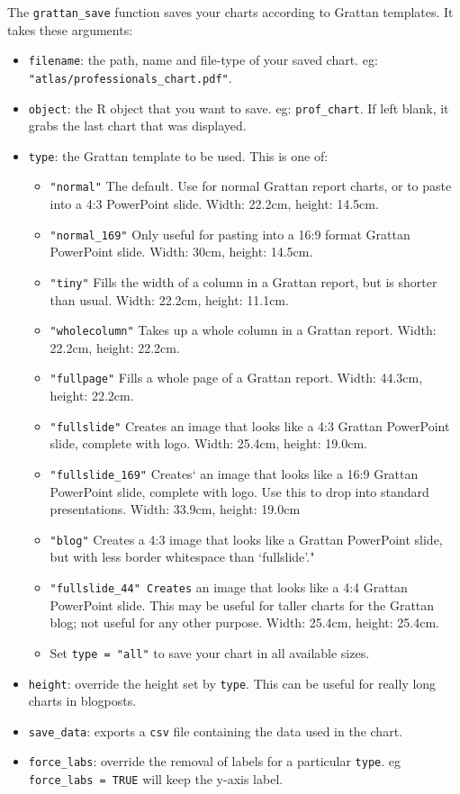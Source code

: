 \documentclass[
]{book}
\providecommand{\tightlist}{%
  \setlength{\itemsep}{0pt}\setlength{\parskip}{0pt}}
\begin{document}
The \texttt{grattan\_save} function saves your charts according to Grattan templates. It takes these arguments:

\begin{itemize}
\tightlist
\item
  \texttt{filename}: the path, name and file-type of your saved chart. eg: \texttt{"atlas/professionals\_chart.pdf"}.
\item
  \texttt{object}: the R object that you want to save. eg: \texttt{prof\_chart}. If left blank, it grabs the last chart that was displayed.
\item
  \texttt{type}: the Grattan template to be used. This is one of:

  \begin{itemize}
  \tightlist
  \item
    \texttt{"normal"} The default. Use for normal Grattan report charts, or to paste into a 4:3 PowerPoint slide. Width: 22.2cm, height: 14.5cm.
  \item
    \texttt{"normal\_169"} Only useful for pasting into a 16:9 format Grattan PowerPoint slide. Width: 30cm, height: 14.5cm.
  \item
    \texttt{"tiny"} Fills the width of a column in a Grattan report, but is shorter than usual. Width: 22.2cm, height: 11.1cm.
  \item
    \texttt{"wholecolumn"} Takes up a whole column in a Grattan report. Width: 22.2cm, height: 22.2cm.
  \item
    \texttt{"fullpage"} Fills a whole page of a Grattan report. Width: 44.3cm, height: 22.2cm.
  \item
    \texttt{"fullslide"} Creates an image that looks like a 4:3 Grattan PowerPoint slide, complete with logo. Width: 25.4cm, height: 19.0cm.
  \item
    \texttt{"fullslide\_169"} Creates` an image that looks like a 16:9 Grattan PowerPoint slide, complete with logo. Use this to drop into standard presentations. Width: 33.9cm, height: 19.0cm
  \item
    \texttt{"blog"} Creates a 4:3 image that looks like a Grattan PowerPoint slide, but with less border whitespace than `fullslide'."
  \item
    \texttt{"fullslide\_44"\ Creates} an image that looks like a 4:4 Grattan PowerPoint slide. This may be useful for taller charts for the Grattan blog; not useful for any other purpose. Width: 25.4cm, height: 25.4cm.
  \item
    Set \texttt{type\ =\ "all"} to save your chart in all available sizes.
  \end{itemize}
\item
  \texttt{height}: override the height set by \texttt{type}. This can be useful for really long charts in blogposts.
\item
  \texttt{save\_data}: exports a \texttt{csv} file containing the data used in the chart.
\item
  \texttt{force\_labs}: override the removal of labels for a particular \texttt{type}. eg \texttt{force\_labs\ =\ TRUE} will keep the y-axis label.
\end{itemize}
\end{document}
